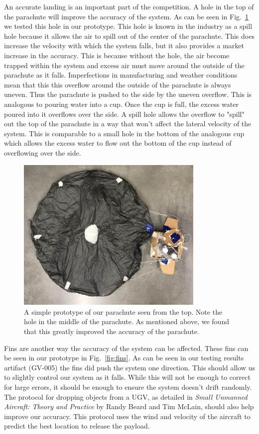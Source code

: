 \documentclass[]{auvsi_doc}
\begin{document}
An accurate landing is an important part of the competition. A hole in the top of the parachute will improve the accuracy of the system. As can be seen in Fig.~\ref{fig:top} we tested this hole in our prototype. This hole is known in the industry as a spill hole because it allows the air to spill out of the center of the parachute. This does increase the velocity with which the system falls, but it also provides a market increase in the accuracy. This is because without the hole, the air become trapped within the system and excess air must move around the outside of the parachute as it falls. Imperfections in manufacturing and weather conditions mean that this this overflow around the outside of the  parachute is always uneven. Thus the parachute is pushed to the side by the uneven overflow. This is analogous to pouring water into a cup. Once the cup is full, the excess water poured into it overflows over the side. A spill hole allows the overflow to "spill" out the top of the parachute in a way that won't affect the lateral velocity of the system. This is comparable to a small hole in the bottom of the analogous cup which allows the excess water to flow out the bottom of the cup instead of overflowing over the side. 

\begin{figure}[ht]
\centering
\includegraphics[width=90mm]{./figs/Parachute_Top.jpg}
\caption{A simple prototype of our parachute seen from the top. Note the hole in the middle of the parachute. As mentioned above, we found that this greatly improved the accuracy of the parachute.}
\label{fig:top}
\end{figure}

Fins are another way the accuracy of the system can be affected. These fins can be seen in our prototype in Fig.~\ref{fig:fins}. As can be seen in our testing results artifact (GV-005) the fins did push the system one direction. This should allow us to slightly control our system as it falls. While this will not be enough to correct for large errors, it should be enough to ensure the system doesn't drift randomly. The protocol for dropping objects from a UGV, as detailed in \textit{Small Unmanned Aircraft: Theory and Practice} by Randy Beard and Tim McLain, should also help improve our accuracy. This protocol uses the wind and velocity of the aircraft to predict the best location to release the payload.
\end{document}
